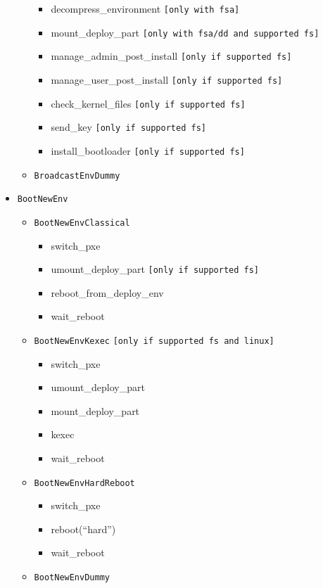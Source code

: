 \documentclass[a4wide,10pt,oneside]{book}
\begin{document}
\begin{itemize}
\begin{itemize}
\begin{itemize}
      \item decompress\_environment \texttt{[only with fsa]}
      \item mount\_deploy\_part \texttt{[only with fsa/dd and supported fs]}
      \item manage\_admin\_post\_install \texttt{[only if supported fs]}
      \item manage\_user\_post\_install \texttt{[only if supported fs]}
      \item check\_kernel\_files \texttt{[only if supported fs]}
      \item send\_key \texttt{[only if supported fs]}
      \item install\_bootloader \texttt{[only if supported fs]}
      \end{itemize}
    \item \texttt{BroadcastEnvDummy}
  \end{itemize}
\item \texttt{BootNewEnv}
  \begin{itemize}
    \item \texttt{BootNewEnvClassical}
      \begin{itemize}
      \item switch\_pxe
      \item umount\_deploy\_part \texttt{[only if supported fs]}
      \item reboot\_from\_deploy\_env
      \item wait\_reboot
      \end{itemize}
    \item \texttt{BootNewEnvKexec} \texttt{[only if supported fs and linux]}
      \begin{itemize}
      \item switch\_pxe
      \item umount\_deploy\_part
      \item mount\_deploy\_part
      \item kexec
      \item wait\_reboot
      \end{itemize}
    \item \texttt{BootNewEnvHardReboot}
      \begin{itemize}
      \item switch\_pxe
      \item reboot(``hard'')
      \item wait\_reboot
      \end{itemize}
    \item \texttt{BootNewEnvDummy}
  \end{itemize}
\end{itemize}
\end{document}

